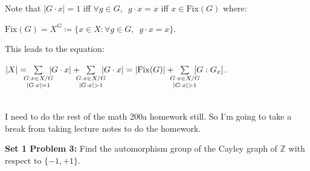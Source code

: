 \documentclass{book}
\newcommand{\hTwo}{%
\color{Black}%
   \fontsize{13}{15}\selectfont%
}
\newcommand{\Hstatement}{%
   \color{MidnightBlue!90!Black}%
   \fontsize{12}{13}\selectfont%
}
\newcommand{\blab}[1]{\textbf{#1}}
\newcommand{\gap}{\phantom{2}}
\newcommand{\Fix}{\mathrm{Fix}}
\newcommand{\mySepTwo}[1][.]{%
   {\noindent\color{#1}{\rule{6.5in}{0.5mm}}}\\%
}
\newcommand{\retTwo}{\hfill\bigbreak}
\begin{document}
\hTwo Note that $|G \cdot x| = 1$ iff $\forall g \in G,\gap g \cdot x = x$ iff $x \in \Fix(G)$ where:

{\centering$\Fix(G) = X^G \coloneqq \{x \in X : \forall g \in G,\gap g \cdot x = x\}$.\retTwo\par}

This leads to the equation:

{\centering$|X| = \hspace{-0.8em}\sum\limits_{\begin{smallmatrix}
	G \cdot x \in X/G \\ |G \cdot x| = 1
\end{smallmatrix}}\hspace{-0.8em} |G \cdot x| + 
\hspace{-0.8em}\sum\limits_{\begin{smallmatrix}
	G \cdot x \in X/G \\ |G \cdot x| > 1
\end{smallmatrix}}\hspace{-0.8em} |G \cdot x| = |\Fix(G)| + 
\hspace{-0.8em}\sum\limits_{\begin{smallmatrix}
	G \cdot x \in X/G \\ |G \cdot x| > 1
\end{smallmatrix}}\hspace{-0.8em} [G:G_x]$.\retTwo\par}

\Hstatement\mySepTwo

\hTwo I need to do the rest of the math 200a homework still. So I'm going to take a break from taking lecture notes to do the homework.\retTwo

\Hstatement\blab{Set 1 Problem 3:} Find the automorphism group of the Cayley graph of $\mathbb{Z}$ with respect to $\{-1, +1\}$.
\end{document}
